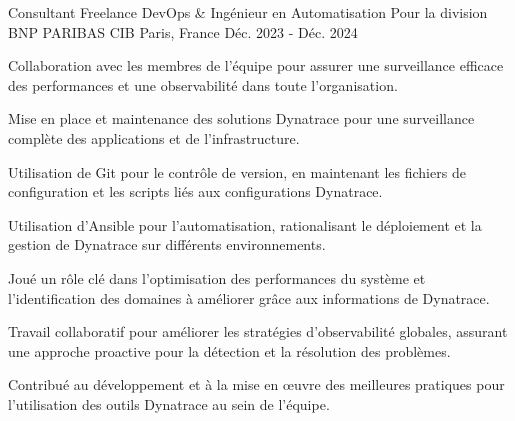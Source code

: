 
\begin{cventries}

\cventry
{Consultant Freelance DevOps \& Ingénieur en Automatisation} %
{Pour la division BNP PARIBAS CIB} %
{Paris, France} %
{Déc. 2023 - Déc. 2024} %
{
  \begin{cvitems} %
    \item {Collaboration avec les membres de l'équipe pour assurer une surveillance efficace des performances et une observabilité dans toute l'organisation.}
    \item {Mise en place et maintenance des solutions Dynatrace pour une surveillance complète des applications et de l'infrastructure.}
    \item {Utilisation de Git pour le contrôle de version, en maintenant les fichiers de configuration et les scripts liés aux configurations Dynatrace.}
    \item {Utilisation d'Ansible pour l'automatisation, rationalisant le déploiement et la gestion de Dynatrace sur différents environnements.}
    \item {Joué un rôle clé dans l'optimisation des performances du système et l'identification des domaines à améliorer grâce aux informations de Dynatrace.}
    \item {Travail collaboratif pour améliorer les stratégies d'observabilité globales, assurant une approche proactive pour la détection et la résolution des problèmes.}
    \item {Contribué au développement et à la mise en œuvre des meilleures pratiques pour l'utilisation des outils Dynatrace au sein de l'équipe.}
  \end{cvitems}
}


\end{cventries}
